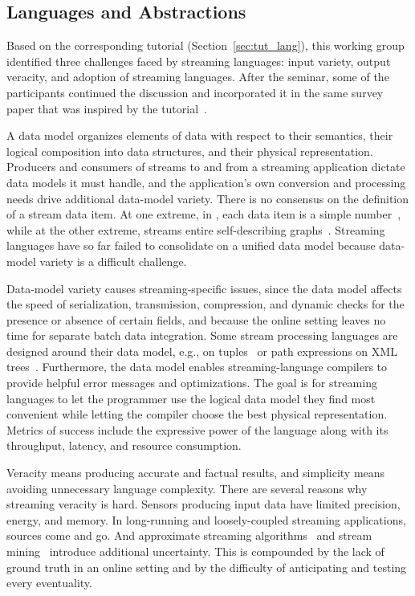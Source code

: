 \subsection{Languages and Abstractions}\label{sec:wg_lang}

Based on the corresponding tutorial (Section~\ref{sec:tut_lang}), this
working group identified three challenges faced by streaming
languages: input variety, output veracity, and adoption of streaming
languages. After the seminar, some of the participants continued the
discussion and incorporated it in the same survey paper that was
inspired by the tutorial~\cite{hirzel_et_al_2018}.

\iffalse
{}
A data model organizes elements of data with respect to
their semantics, their logical composition into data structures, and
their physical representation. Producers and consumers of streams to
and from a streaming application dictate data models it must handle,
and the application's own conversion and processing needs drive
additional data-model variety.  There is no consensus on the definition of a stream
data item. At one extreme, in , each data item is a simple
number~\cite{thies_et_al_2002}, while at the other extreme, \mbox{}
streams entire self-describing graphs~\cite{barbieri_et_al_2009}.
Streaming languages have so far failed to consolidate on a unified data model
because data-model variety is a difficult challenge.

Data-model variety causes streaming-specific issues, since the data
model affects the speed of serialization, transmission, compression,
and dynamic checks for the presence or absence of certain fields, and
because the online setting leaves no time for separate batch data
integration. Some stream processing languages are designed around
their data model, e.g.,  on tuples~\cite{arasu_babu_widom_2006} or
path expressions on XML trees~\cite{diao_et_al_2002}. Furthermore, the
data model enables streaming-language compilers to provide helpful
error messages and optimizations. The goal is for streaming languages to let the programmer use the
logical data model they find most convenient while letting the
compiler choose the best physical representation. Metrics of success
include the expressive power of the language along with its throughput,
latency, and resource consumption.

Veracity means producing accurate and factual results, and
simplicity means avoiding unnecessary language complexity. There are
several reasons why streaming veracity is hard. Sensors producing
input data have limited precision, energy, and memory. In
long-running and loosely-coupled streaming applications,
sources come and go. And approximate streaming
algorithms~\cite{babcock_et_al_2002} and stream
mining~\cite{gaber_zaslavsky_krishnaswamy_2005} introduce additional
uncertainty. This is compounded by the lack of ground truth in an
online setting and by the difficulty of anticipating and testing
every eventuality.

